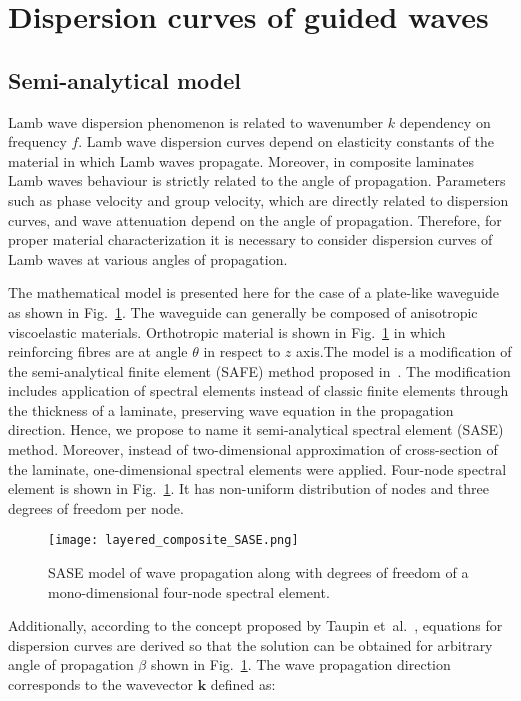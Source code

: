 \documentclass[preprint,12pt]{elsarticle}
\newcommand{\vect}[1]{\mathbf{#1}} %
\begin{document}
	
	\section{Dispersion curves of guided waves \label{sec:dispersion_curves}}
	\subsection{Semi-analytical model}
	Lamb wave dispersion phenomenon is related to wavenumber  $k$ dependency on frequency $f$. Lamb wave dispersion curves depend on elasticity constants of the material in which Lamb waves propagate. Moreover, in composite laminates Lamb waves behaviour is strictly related to the angle of propagation. Parameters such as phase velocity and group velocity, which are directly related to dispersion curves, and wave attenuation depend on the angle of propagation. Therefore, for proper material characterization it is necessary to consider dispersion curves of Lamb waves at various angles of propagation.
	
	The mathematical model is presented here for the case of a plate-like waveguide as shown in Fig.~\ref{fig:layered_composite_SASE}.  The waveguide can generally be composed of anisotropic viscoelastic materials. Orthotropic material is shown in Fig.~\ref{fig:layered_composite_SASE} in which reinforcing fibres are at angle $\theta$ in respect to $z$ axis.The model is a modification of the semi-analytical finite element (SAFE) method proposed in~\cite{Bartoli2006}. The modification includes application of spectral elements instead of classic finite elements through the thickness of a laminate, preserving wave equation in the propagation direction. Hence, we propose to name it semi-analytical spectral element (SASE) method. Moreover, instead of two-dimensional approximation of cross-section of the laminate, one-dimensional spectral elements were applied. Four-node spectral element is shown in Fig.~\ref{fig:layered_composite_SASE}. It has non-uniform distribution of nodes and three degrees of freedom per node.
	
		\begin{figure} [h!]
		\centering
		\texttt{[image: layered\_composite\_SASE.png]}
		\caption{SASE model of wave propagation along with degrees of freedom of a mono-dimensional four-node spectral element.}
		\label{fig:layered_composite_SASE}
	\end{figure}
	
	Additionally, according to the concept proposed by Taupin et~al.~\cite{Taupin2011}, equations for dispersion curves are derived so that the solution can be obtained for arbitrary angle of propagation $\beta$ shown in Fig.~\ref{fig:layered_composite_SASE}. The wave propagation direction corresponds to the wavevector $\vect{k}$ defined as:
	
\end{document}
